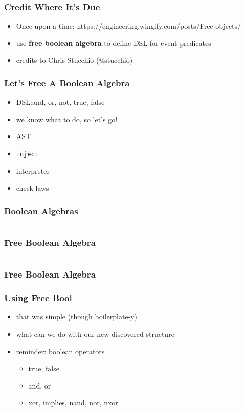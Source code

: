 \documentclass{beamer}
\newcommand{\recipe}{%
  \begin{itemize}
  \item AST
  \item \texttt{inject}
  \item interpreter
  \item check laws
  \end{itemize}
}
\begin{document}
\begin{frame}
  \frametitle{Credit Where It's Due}
  \begin{itemize}
  \item Once upon a time:
    https://engineering.wingify.com/posts/Free-objects/
  \item use \textbf{free boolean algebra} to define DSL for event
    predicates
  \item credits to Chris Stucchio (@stucchio)
  \end{itemize}
\end{frame}

\begin{frame}
  \frametitle{Let's Free A Boolean Algebra}
  \begin{itemize}
  \item DSL:\@ and, or, not, true, false
  \item we know what to do, so let's go!
  \end{itemize}
  \recipe{}
\end{frame}

\begin{frame}
  \frametitle{Boolean Algebras}
  \inputminted{scala}{snippets/boolean-algebra.scala}
\end{frame}

\begin{frame}
  \frametitle{Free Boolean Algebra}
  \inputminted{scala}{snippets/free-bool.scala}
\end{frame}

\begin{frame}
  \frametitle{Free Boolean Algebra}
\end{frame}

\begin{frame}
  \frametitle{Using Free Bool}
  \begin{itemize}
  \item that was simple (though boilerplate-y)
  \item what can we do with our new discovered structure
  \item reminder: boolean operators
    \begin{itemize}
    \item true, false
    \item and, or
    \item xor, implies, nand, nor, nxor
    \end{itemize}
  \end{itemize}
\end{frame}
\end{document}

